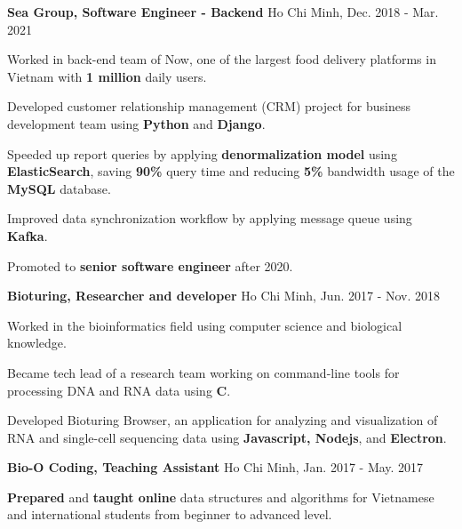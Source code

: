 \begin{cventries} %
  \cvsimpleentry
    {\textbf{Sea Group, Software Engineer - Backend}} %
    {Ho Chi Minh, Dec. 2018 - Mar. 2021} %
    {
      \begin{cvitems} %
        \item {Worked in back-end team of Now, one of the largest food delivery platforms in Vietnam with \textbf{1 million} daily users.}
        \item {Developed customer relationship management (CRM) project for business development team using \textbf{Python} and \textbf{Django}.}
        \item {Speeded up report queries by applying \textbf{denormalization model} using \textbf{ElasticSearch}, saving \textbf{90\%} query time and reducing \textbf{5\%} bandwidth usage of the \textbf{MySQL} database.}
        \item {Improved data synchronization workflow by applying message queue using \textbf{Kafka}.}
        \item {Promoted to \textbf{senior software engineer} after 2020.}
      \end{cvitems}
    }

  \cvsimpleentry
    {\textbf{Bioturing, Researcher and developer}} %
    {Ho Chi Minh, Jun. 2017 - Nov. 2018} %
    {
      \begin{cvitems} %
        \item {Worked in the bioinformatics field using computer science and biological knowledge.}
        \item {Became tech lead of a research team working on command-line tools for processing DNA and RNA data using \textbf{C}.}
        \item {Developed Bioturing Browser, an application for analyzing and visualization of RNA and single-cell sequencing data using \textbf{Javascript, Nodejs}, and \textbf{Electron}.}
      \end{cvitems}
    }

  \cvsimpleentry
    {\textbf{Bio-O Coding, Teaching Assistant}} %
    {Ho Chi Minh, Jan. 2017 - May. 2017} %
    {
      \begin{cvitems} %
        \item {\textbf{Prepared} and \textbf{taught online} data structures and algorithms for Vietnamese and international students from beginner to advanced level.}
      \end{cvitems}
    }

\end{cventries}
